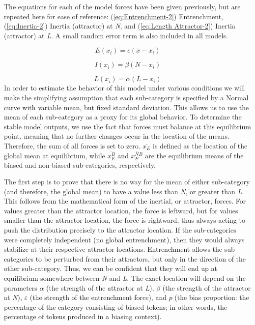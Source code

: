 The equations for each of the model forces have been given previously,
but are repeated here for ease of reference: (\ref{eq:Entrenchment-2})
Entrenchment, (\ref{eq:Inertia-2}) Inertia (attractor) at \emph{N},
and (\ref{eq:Length Attractor-2}) Inertia (attractor) at\emph{ L}.
A small random error term is also included in all models. 

\begin{equation}
E(x_{i})=\epsilon(\bar{x}-x_{i})\label{eq:Entrenchment-2}
\end{equation}

\begin{equation}
I(x_{i})=\beta(N-x_{i})\label{eq:Inertia-2}
\end{equation}

\begin{equation}
L(x_{i})=\alpha(L-x_{i})\label{eq:Length Attractor-2}
\end{equation}
In order to estimate the behavior of this model under various conditions
we will make the simplifying assumption that each sub-category is
specified by a Normal curve with variable mean, but fixed standard
deviation. This allows us to use the mean of each sub-category as
a proxy for its global behavior. To determine the stable model outputs,
we use the fact that forces must balance at this equilibrium point,
meaning that no further changes occur in the location of the means.
Therefore, the sum of all forces is set to zero. $\overline{x_{E}}$
is defined as the location of the global mean at equilibrium, while
$\overline{x_{E}^{B}}$ and $\overline{x_{E}^{NB}}$ are the equilibrium
means of the biased and non-biased sub-categories, respectively. 

The first step is to prove that there is no way for the mean of either
sub-category (and therefore, the global mean) to have a value less
than \emph{N}, or greater than \emph{L}. This follows from the mathematical
form of the inertial, or attractor, forces. For values greater than
the attractor location, the force is leftward, but for values smaller
than the attractor location, the force is rightward, thus always acting
to push the distribution precisely to the attractor location. If the
sub-categories were completely independent (no global entrenchment),
then they would always stabilize at their respective attractor locations.
Entrenchment allows the sub-categories to be perturbed from their
attractors, but only in the direction of the other sub-category. Thus,
we can be confident that they will end up at equilibrium somewhere
between \emph{N} and \emph{L}. The exact location will depend on the
parameters $\alpha$ (the strength of the attractor at \emph{L}),
$\beta$ (the strength of the attractor at \emph{N}), $\varepsilon$
(the strength of the entrenchment force), and $p$ (the bias proportion:
the percentage of the category consisting of biased tokens; in other
words, the percentage of tokens produced in a biasing context). 

